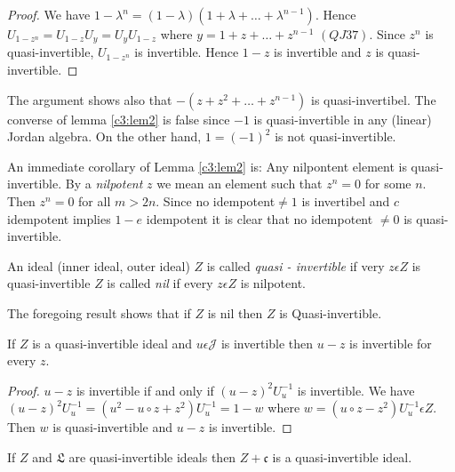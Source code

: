 \begin{proof}
  We have
  $1-\lambda^{n}=(1-\lambda)(1+\lambda+\ldots+\lambda^{n-1})$. Hence
  $U_{1-z^{n}}=U_{1-z}U_y=U_yU_{1-z}$ where $y=1+z+\ldots+z^{n-1}$ $(QJ
  37)$. Since $z^{n}$ is quasi-invertible, $U_{1-z^{n}}$ is
  invertible. Hence $1-z$ is invertible and $z$ is quasi-invertible.
\end{proof}

\begin{remarks*}
  The argument shows also that $-(z+z^{2}+\ldots+z^{n-1})$ is
  quasi-invertibel. The converse of lemma \ref{c3:lem2} is false since $-1$ is
  quasi-invertible in any (linear) Jordan algebra. On the other hand,
  $1=(-1)^{2}$ is not quasi-invertible.
  
  An immediate corollary of Lemma \ref{c3:lem2} is: Any nilpontent element is
  quasi-invertible. By a {\em nilpotent} $z$ we mean an element such
  that $z^{n}=0$ for some $n$. Then $z^{n}=0$ for all $m>2n$. Since no
  idempotent\pageoriginale $\neq 1$ is invertibel and $c$ idempotent
  implies $1-e$ idempotent it is clear that no idempotent $\neq 0$ is
  quasi-invertible. 
\end{remarks*}

\begin{defn}\label{c3:defn2}
  An ideal (inner ideal, outer ideal) $Z$ is called{\em
    quasi - invertible} if very $z\epsilon Z$ is
  quasi-invertible $Z$ is called {\em nil} if every $z\epsilon
  Z$ is nilpotent.
  
  The foregoing result shows that if $Z$ is nil then
  $Z$ is Quasi-invertible.
\end{defn}

\begin{lemma}\label{c3:lem3}
If $Z$ is a quasi-invertible ideal and $u\epsilon
\mathscr{J}$ is invertible then $u-z$ is invertible for every $z$.
\end{lemma}

\begin{proof}
$u-z$ is invertible if and only if $(u-z)^{2}U^{-1}_u$ is
  invertible. We have $(u-z)^{2}U^{-1}_u=(u^{2}-u\circ z
  +z^{2})U^{-1}_u=1-w$ where $w=(u\circ z-z^{2})U^{-1}_u\epsilon
  Z$. Then $w$ is quasi-invertible and $u-z$ is invertible.
\end{proof}

\begin{lemma}\label{c3:lem4}
If $Z$ and $\mathfrak{L}$ are quasi-invertible ideals then
$Z+\mathfrak{c}$ is a quasi-invertible ideal.
\end{lemma}

